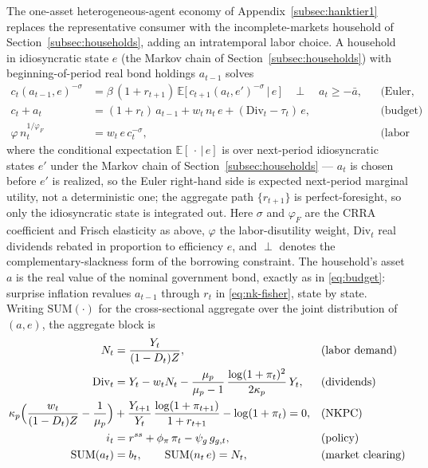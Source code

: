 \documentclass[12pt]{article}
\newcommand{\E}{\mathbb{E}}
\newcommand{\vphi}{\varphi}
\begin{document}
The one-asset heterogeneous-agent economy of
Appendix~\ref{subsec:hanktier1} replaces the representative consumer with the
incomplete-markets household of Section~\ref{subsec:households}, adding an
intratemporal labor choice. A household in idiosyncratic state $e$ (the
Markov chain of Section~\ref{subsec:households}) with beginning-of-period
real bond holdings $a_{t-1}$ solves
\begin{align}
c_t(a_{t-1},e)^{-\sigma} &= \beta\,(1+r_{t+1})\,
   \E\!\big[\,c_{t+1}(a_t,e')^{-\sigma}\,\big|\,e\,\big]
   \quad\perp\quad a_t \ge -\bar a, &&\text{(Euler, borrowing constraint)}
   \label{eq:hank-euler}\\
c_t + a_t &= (1+r_t)\,a_{t-1} + w_t\, n_t\, e + (\mathrm{Div}_t-\tau_t)\,e,
   &&\text{(budget)} \label{eq:hank-budget}\\
\vphi\, n_t^{1/\varphi_F} &= w_t\, e\, c_t^{-\sigma},
   &&\text{(labor supply)} \label{eq:hank-labor}
\end{align}
where the conditional expectation $\E[\,\cdot\,|\,e]$ is over next-period
idiosyncratic states $e'$ under the Markov chain of
Section~\ref{subsec:households} --- $a_t$ is chosen before $e'$ is realized, so
the Euler right-hand side is expected next-period marginal utility, not a
deterministic one; the aggregate path $\{r_{t+1}\}$ is perfect-foresight, so
only the idiosyncratic state is integrated out. Here $\sigma$ and $\varphi_F$
are the CRRA coefficient and Frisch elasticity as
above, $\vphi$ the labor-disutility weight, $\mathrm{Div}_t$ real dividends
rebated in proportion to efficiency $e$, and $\perp$ denotes the
complementary-slackness form of the borrowing constraint. The household's asset $a$ is the real value of the nominal
government bond, exactly as in \eqref{eq:budget}: surprise inflation
revalues $a_{t-1}$ through $r_t$ in \eqref{eq:nk-fisher}, state by state.
Writing $\mathrm{SUM}(\cdot)$ for the cross-sectional aggregate over the
joint distribution of $(a,e)$, the aggregate block is
\begin{align}
N_t &= \frac{Y_t}{(1-D_t)Z}, &&\text{(labor demand)} \label{eq:hank-labdemand}\\
\mathrm{Div}_t &= Y_t - w_t N_t
   - \frac{\mu_p}{\mu_p-1}\,\frac{\log(1+\pi_t)^2}{2\kappa_p}\,Y_t,
   &&\text{(dividends)} \label{eq:hank-div}\\
\kappa_p\Bigl(\frac{w_t}{(1-D_t)Z}-\frac{1}{\mu_p}\Bigr)
   &+ \frac{Y_{t+1}}{Y_t}\,\frac{\log(1+\pi_{t+1})}{1+r_{t+1}}
   - \log(1+\pi_t) = 0, &&\text{(NKPC)} \label{eq:hank-nkpc}\\
i_t &= r^{ss} + \phi_\pi\,\pi_t - \psi_g\, g_{g,t}, &&\text{(policy)} \label{eq:hank-policy}\\
\mathrm{SUM}(a_t) &= b_t, \qquad \mathrm{SUM}(n_t\, e) = N_t,
   &&\text{(market clearing)} \label{eq:hank-clearing}
\end{align}
\end{document}
